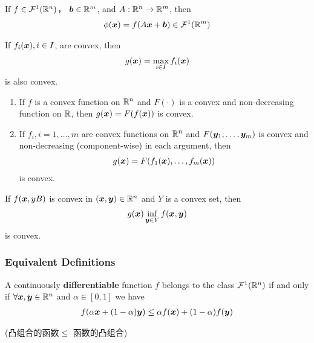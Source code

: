 \begin{lemma}
    If $f\in\mathcal{F}^1(\mathbb{R}^n)$， $\bm b\in\mathbb{R}^m$, and $A:\mathbb{R}^n\to\mathbb{R}^m$, then 
    \begin{align*}
        \phi(\bm{x})=f(A\bm{x}+\bm b)\in\mathcal{F}^1(\mathbb{R}^m)
    \end{align*}
\end{lemma}

\begin{lemma}\quad

    If $f_i(\bm{x}), i\in I$, are convex, then 
    \begin{align*}
        g(\bm{x})=\max_{i\in I}f_i(\bm{x})
    \end{align*}
    is also convex. 
\end{lemma}

\begin{lemma}\quad

    \begin{enumerate}
        \item If $f$ is a convex function on $\mathbb{R}^n$ and $F(\cdot)$ is a convex and non-decreasing function on $\mathbb{R}$, then $g(\bm{x})=F(f(\bm{x}))$ is convex. 
        \item If $f_i,i=1,\dots,m$ are convex functions on $\mathbb{R}^n$ and $F(\bm{y}_1,\dots,\bm{y}_m)$ is convex and non-decreasing (component-wise) in each argument, then 
        \begin{align*}
            g(\bm{x})=F(f_1(\bm{x}),\dots,f_m(\bm{x}))
        \end{align*}
        is convex. 
    \end{enumerate}
\end{lemma}

\begin{lemma}
    If $f(\bm{x},yB)$ is convex in $(\bm{x},\bm{y})\in\mathbb{R}^n$ and $Y$ is a convex set, then 
    \begin{align*}
        g(\bm x)\inf_{\bm{y}\in Y}f(\bm{x},\bm{y})
    \end{align*}
    is convex. 
\end{lemma}


\subsubsection{Equivalent Definitions}

\begin{theorem}
    A continuously \textbf{differentiable} function $f$ belongs to the class $\mathcal{F}^1(\mathbb{R}^n)$ if and only if $\forall \bm{x},\bm{y}\in\mathbb{R}^n$ and $\alpha\in [0,1]$ we have
    \begin{align*}
        f(\alpha \bm{x}+(1-\alpha )\bm{y})\le \alpha f(\bm{x})+(1-\alpha)f(\bm{y})
    \end{align*}
\end{theorem}
(凸组合的函数$\le$ 函数的凸组合)%

